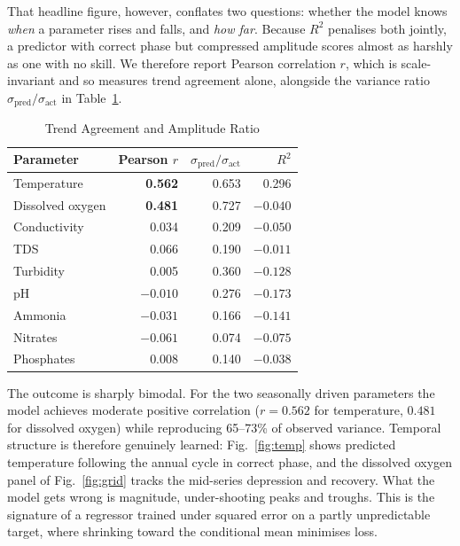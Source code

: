 \documentclass[conference]{IEEEtran}
\begin{document}
That headline figure, however, conflates two questions: whether the model knows
\emph{when} a parameter rises and falls, and \emph{how far}. Because $R^2$
penalises both jointly, a predictor with correct phase but compressed amplitude
scores almost as harshly as one with no skill. We therefore report Pearson
correlation $r$, which is scale-invariant and so measures trend agreement
alone, alongside the variance ratio $\sigma_{\text{pred}}/\sigma_{\text{act}}$
in Table~\ref{tab:trend}.

\begin{table}[!t]
\caption{Trend Agreement and Amplitude Ratio}
\label{tab:trend}
\centering
\small
\begin{tabular}{lrrr}
\toprule
\textbf{Parameter} & \textbf{Pearson $r$} & \textbf{$\sigma_{\text{pred}}/\sigma_{\text{act}}$} & \textbf{$R^2$} \\
\midrule
Temperature      & \textbf{0.562} & 0.653 & 0.296 \\
Dissolved oxygen & \textbf{0.481} & 0.727 & $-0.040$ \\
\midrule
Conductivity     & 0.034 & 0.209 & $-0.050$ \\
TDS              & 0.066 & 0.190 & $-0.011$ \\
Turbidity        & 0.005 & 0.360 & $-0.128$ \\
pH               & $-0.010$ & 0.276 & $-0.173$ \\
Ammonia          & $-0.031$ & 0.166 & $-0.141$ \\
Nitrates         & $-0.061$ & 0.074 & $-0.075$ \\
Phosphates       & 0.008 & 0.140 & $-0.038$ \\
\bottomrule
\end{tabular}
\end{table}

The outcome is sharply bimodal. For the two seasonally driven parameters the
model achieves moderate positive correlation ($r=0.562$ for temperature,
$0.481$ for dissolved oxygen) while reproducing 65--73\% of observed variance.
Temporal structure is therefore genuinely learned: Fig.~\ref{fig:temp} shows
predicted temperature following the annual cycle in correct phase, and the
dissolved oxygen panel of Fig.~\ref{fig:grid} tracks the mid-series depression
and recovery. What the model gets wrong is magnitude, under-shooting peaks and
troughs. This is the signature of a regressor trained under squared error on a
partly unpredictable target, where shrinking toward the conditional mean
minimises loss.
\end{document}
